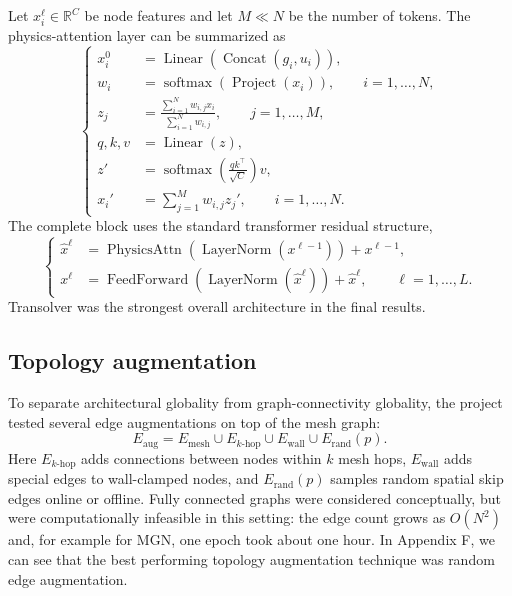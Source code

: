 \documentclass[11pt,a4paper,reqno]{amsart}
\theoremstyle{definition}
\theoremstyle{remark}
\numberwithin{equation}{section}
\newcommand{\R}{\mathbb{R}}
\newcommand{\softmax}{\operatorname{softmax}}
\newcommand{\concat}{\operatorname{Concat}}
\newcommand{\LayerNorm}{\operatorname{LayerNorm}}
\newcommand{\PhysicsAttn}{\operatorname{PhysicsAttn}}
\newcommand{\FeedForward}{\operatorname{FeedForward}}
\begin{document}
Let $x_i^\ell\in\R^C$ be node features and let $M\ll N$ be the number of tokens. The physics-attention layer can be summarized as
\begin{equation}
\left\{
\begin{aligned}
    x_i^0 &= \operatorname{Linear}(\concat(g_i,u_i)),\\
    w_i &= \softmax(\operatorname{Project}(x_i)),\qquad i=1,\ldots,N,\\
    z_j &= \frac{\sum_{i=1}^N w_{i,j}x_i}{\sum_{i=1}^N w_{i,j}},
    \qquad j=1,\ldots,M,\\
    q,k,v &= \operatorname{Linear}(z),\\
    z' &= \softmax\left(\frac{qk^\top}{\sqrt C}\right)v,\\
    x_i' &= \sum_{j=1}^M w_{i,j}z_j',\qquad i=1,\ldots,N.
\end{aligned}
\right.
\label{eq:transolver-attn}
\end{equation}
The complete block uses the standard transformer residual structure,
\begin{equation}
\left\{
\begin{aligned}
    \hat x^\ell &= \PhysicsAttn(\LayerNorm(x^{\ell-1}))+x^{\ell-1},\\
    x^\ell &= \FeedForward(\LayerNorm(\hat x^\ell))+\hat x^\ell,
    \qquad \ell=1,\ldots,L.
\end{aligned}
\right.
\label{eq:transolver-block}
\end{equation}
Transolver was the strongest overall architecture in the final results.

\subsection{Topology augmentation}

To separate architectural globality from graph-connectivity globality, the project tested several edge augmentations on top of the mesh graph:
\begin{equation}
    E_{\mathrm{aug}}=E_{\mathrm{mesh}}\cup E_{k\text{-hop}}\cup E_{\mathrm{wall}}\cup E_{\mathrm{rand}}(p).
    \label{eq:edge-aug}
\end{equation}
Here $E_{k\text{-hop}}$ adds connections between nodes within $k$ mesh hops, $E_{\mathrm{wall}}$ adds special edges to wall-clamped nodes, and $E_{\mathrm{rand}}(p)$ samples random spatial skip edges online or offline. Fully connected graphs were considered conceptually, but were computationally infeasible in this setting: the edge count grows as $O(N^2)$ and, for example for MGN, one epoch took about one hour. In Appendix F, we can see that the best performing topology augmentation technique was random edge augmentation.
\end{document}
